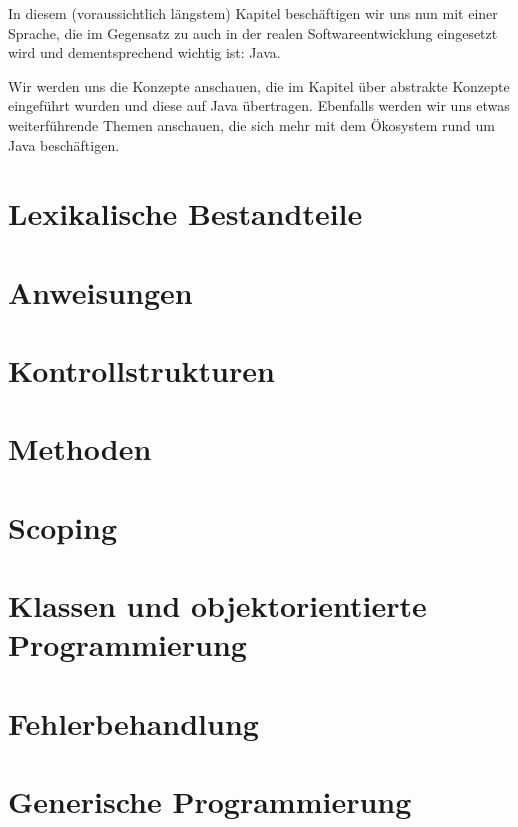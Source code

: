 In diesem (voraussichtlich längstem) Kapitel beschäftigen wir uns nun mit einer Sprache, die im Gegensatz zu \racket auch in der realen Softwareentwicklung eingesetzt wird und dementsprechend wichtig ist: Java.

Wir werden uns die Konzepte anschauen, die im Kapitel über abstrakte Konzepte eingeführt wurden und diese auf Java übertragen. Ebenfalls werden wir uns etwas weiterführende Themen anschauen, die sich mehr mit dem Ökosystem rund um Java beschäftigen. 

\section{Lexikalische Bestandteile}
	

\section{Anweisungen}
	

\section{Kontrollstrukturen}
	

\section{Methoden}
	

\section{Scoping}
	

\section{Klassen und objektorientierte Programmierung}
	

\section{Fehlerbehandlung}
	

\section{Generische Programmierung}
	

